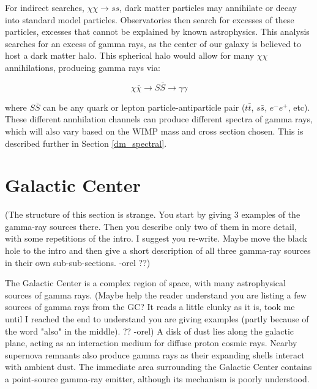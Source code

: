     For indirect searches, $\chi\chi \rightarrow ss$, dark matter particles may annihilate or decay into standard model particles.
    Observatories then search for excesses of these particles, excesses that cannot be explained by known astrophysics.
    This analysis searches for an excess of gamma rays, as the center of our galaxy is believed to host a dark matter halo.
    This spherical halo would allow for many $\chi\chi$ annihilations, producing gamma rays via: 
    
    $$\chi\bar{\chi} \rightarrow S\bar{S} \rightarrow \gamma\gamma$$

    where $S\bar{S}$ can be any quark or lepton particle-antiparticle pair ($t\bar{t}$, $s\bar{s}$, $e^{-}e^{+}$, etc).
    These different annhilation channels can produce different spectra of gamma rays, which will also vary based on the WIMP mass and cross section chosen.
    This is described further in Section \ref{dm_spectral}.

\FloatBarrier

\section{Galactic Center}
  
  {\color{red}(The structure of this section is strange. You start by giving 3 examples of the gamma-ray sources there. Then you describe only two of them in more detail, with some repetitions of the intro. I suggest you re-write. Maybe move the black hole to the intro and then give a short description of all three gamma-ray sources in their own sub-sub-sections. -orel ??)}

  The Galactic Center is a complex region of space, with many astrophysical sources of gamma rays.
  {\color{red}(Maybe help the reader understand you are listing a few sources of gamma rays from the GC? It reads a little clunky as it is, took me until I reached the end to understand you are giving examples (partly because of the word "also" in the middle). ?? -orel)}
  A disk of dust lies along the galactic plane, acting as an interaction medium for diffuse proton cosmic rays.
  Nearby supernova remnants also produce gamma rays as their expanding shells interact with ambient dust.
  The immediate area surrounding the Galactic Center contains a point-source gamma-ray emitter, although its mechanism is poorly understood.

